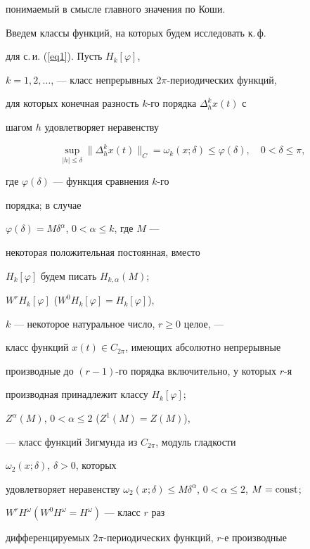 понимаемый в смысле главного значения по Коши.





Введем классы функций, на которых будем исследовать к.\,ф.


для с.\,и. (\ref{eq1}). Пусть $H_k[\varphi]$,


$k=1,2,\dotsc$, --- класс непрерывных $2\pi$-периодических функций,


для которых конечная разность $k$-го порядка $\Delta_h^kx(t)$ с


шагом $h$ удовлетворяет неравенству


$$


\sup_{|h|\leq\delta}\|\Delta_h^kx(t)\|_C=


\omega_k(x;\delta)\leq\varphi(\delta),


\quad0<\delta\leq\pi,


$$


где $\varphi(\delta)$ --- функция сравнения $k$-го


порядка; в случае


$\varphi(\delta)=M\delta^\alpha$, $0<\alpha\leq{k}$, где $M$ ---


некоторая положительная постоянная, вместо


$H_k[\varphi]$ будем писать $H_{k,\alpha}(M)$;


$W^rH_k[\varphi]$ ($W^0H_k[\varphi]=H_k[\varphi]$),\linebreak


$k$ --- некоторое натуральное число, $r\geq0$ целое, ---


класс функций $x(t)\in C_{2\pi}$, имеющих абсолютно непрерывные


производные до $(r-1)$-го порядка включительно, у которых $r$-я


производная принадлежит классу $H_k[\varphi]$;


$Z^\alpha(M)$, $0<\alpha\leq2$ ($Z^1(M)=Z(M)$),


--- класс функций Зигмунда из $C_{2\pi}$, модуль гладкости


$\omega_2(x;\delta)$, $\delta>0$, которых


удовлетворяет неравенству $\omega_2(x;\delta)\leq


M\delta^\alpha$, $0<\alpha\leq2$, $M=\const$;


$W^rH^\omega(W^0H^\omega=H^\omega)$ --- класс $r$ раз


дифференцируемых $2\pi$-периодических функций, $r$-е производные


